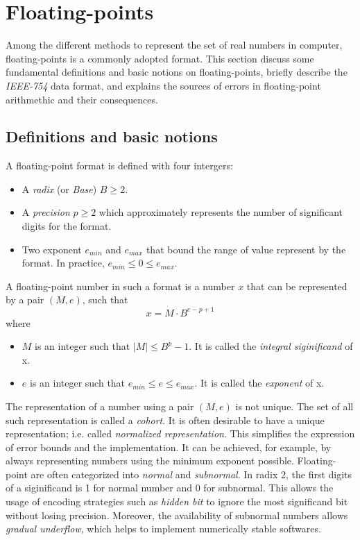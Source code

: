 \chapter{Floating-points}
\begin{comment}
This section will discuss:
- Floating-point
* Definitions and basic notions
* IEEE-754
* Sources of error
\end{comment}
Among the different methods to represent the set of real numbers in computer,
floating-points is a commonly adopted format.
This section discuss some fundamental definitions and basic notions on
floating-points, briefly describe the \textit{IEEE-754} data format, and 
explains the sources of errors in floating-point arithmethic and their consequences.

\section{Definitions and basic notions}
\begin{comment}
- Properties of float arithmetic
\end{comment}
A floating-point format is defined with four intergers:
\begin{itemize}
	\item A \textit{radix} (or \textit{Base}) $B \ge 2$.
	\item A \textit{precision} $p \ge 2$ which approximately represents the number of significant digits for the format.
	\item Two exponent $e_{min}$ and $e_{max}$ that bound the range of value represent by the format. In practice, $e_{min} \le 0 \le e_{max}$.
\end{itemize}

A floating-point number in such a format is a number $x$ that can be represented by a pair $(M,e)$, such that
\begin{equation}
	x = M \cdot B^{e-p+1}
\end{equation}
where
\begin{itemize}
	\item $M$ is an integer such that $|M| \le B^{p}-1$. It is called the \textit{integral siginificand} of x.
	\item $e$ is an integer such that $e_{min} \le e \le e_{max}$. It is called the \textit{exponent} of x.
\end{itemize}
The representation of a number using a pair $(M, e)$ is not unique.
The set of all such representation is called a \textit{cohort}.
It is often desirable to have a unique representation; i.e. called \textit{normalized representation}.
This simplifies the expression of error bounds and the implementation.
It can be achieved, for example, by always representing numbers using the minimum exponent possible.
Floating-point are often categorized into \textit{normal} and \textit{subnormal}.
In radix 2, the first digits of a siginificand is 1 for normal number and 0 for subnormal.
This allows the usage of encoding strategies such as \textit{hidden bit} to
ignore the most significand bit without losing precision.
Moreover, the availability of subnormal numbers allows \textit{gradual underflow},
which helps to implement numerically stable softwares.

